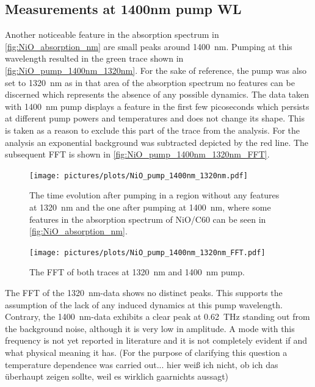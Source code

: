\subsection{Measurements at 1400nm pump WL}
Another noticeable feature in the absorption spectrum in \autoref{fig:NiO_absorption_nm} are small peaks around \qty{1400}{nm}.
Pumping at this wavelength resulted in the green trace shown in \autoref{fig:NiO_pump_1400nm_1320nm}.
For the sake of reference, the pump was also set to \qty{1320}{nm} as in that area of the absorption spectrum no features can be discerned which represents the absence of any possible dynamics.
The data taken with \qty{1400}{nm} pump displays a feature in the first few picoseconds which persists at different pump powers and temperatures and does not change its shape.
This is taken as a reason to exclude this part of the trace from the analysis.
For the analysis an exponential background was subtracted depicted by the red line.
The subsequent FFT is shown in \autoref{fig:NiO_pump_1400nm_1320nm_FFT}.
\begin{figure}[ht]
    \centering
    \texttt{[image: pictures/plots/NiO\_pump\_1400nm\_1320nm.pdf]} \vspace{-0.3cm}
    \caption{The time evolution after pumping in a region without any features at \qty{1320}{nm} and the one after pumping at \qty{1400}{nm}, where some features in the absorption spectrum of NiO/C60 can be seen in \autoref{fig:NiO_absorption_nm}.}
    \label{fig:NiO_pump_1400nm_1320nm}
\end{figure}
\begin{figure}[ht]
    \centering
    \texttt{[image: pictures/plots/NiO\_pump\_1400nm\_1320nm\_FFT.pdf]} \vspace{-0.3cm}
    \caption{The FFT of both traces at \qty{1320}{nm} and \qty{1400}{nm} pump.}
    \label{fig:NiO_pump_1400nm_1320nm_FFT}
\end{figure}
\FloatBarrier
The FFT of the \qty{1320}{nm}-data shows no distinct peaks.
This supports the assumption of the lack of any induced dynamics at this pump wavelength.
Contrary, the \qty{1400}{nm}-data exhibits a clear peak at \qty{0.62}{THz} standing out from the background noise, although it is very low in amplitude.
A mode with this frequency is not yet reported in literature and it is not completely evident if and what physical meaning it has.
(For the purpose of clarifying this question a temperature dependence was carried out... hier weiß ich nicht, ob ich das überhaupt zeigen sollte, weil es wirklich gaarnichts aussagt)

